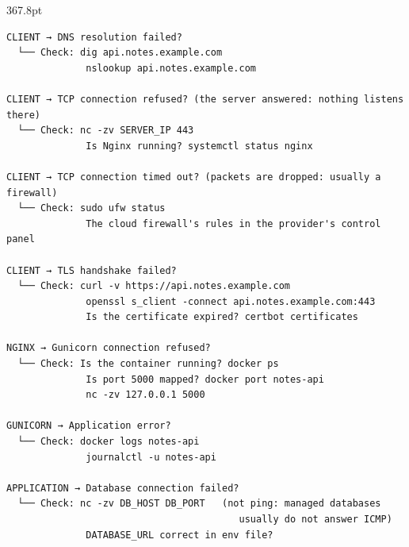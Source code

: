 \begin{diagrambox}[short]{367.8pt}
\begin{Verbatim}[fontsize=\fontsize{9.0}{8.55}\selectfont]
CLIENT → DNS resolution failed?
  └── Check: dig api.notes.example.com
              nslookup api.notes.example.com

CLIENT → TCP connection refused? (the server answered: nothing listens there)
  └── Check: nc -zv SERVER_IP 443
              Is Nginx running? systemctl status nginx

CLIENT → TCP connection timed out? (packets are dropped: usually a firewall)
  └── Check: sudo ufw status
              The cloud firewall's rules in the provider's control panel

CLIENT → TLS handshake failed?
  └── Check: curl -v https://api.notes.example.com
              openssl s_client -connect api.notes.example.com:443
              Is the certificate expired? certbot certificates

NGINX → Gunicorn connection refused?
  └── Check: Is the container running? docker ps
              Is port 5000 mapped? docker port notes-api
              nc -zv 127.0.0.1 5000

GUNICORN → Application error?
  └── Check: docker logs notes-api
              journalctl -u notes-api

APPLICATION → Database connection failed?
  └── Check: nc -zv DB_HOST DB_PORT   (not ping: managed databases
                                         usually do not answer ICMP)
              DATABASE_URL correct in env file?
\end{Verbatim}
\end{diagrambox}

